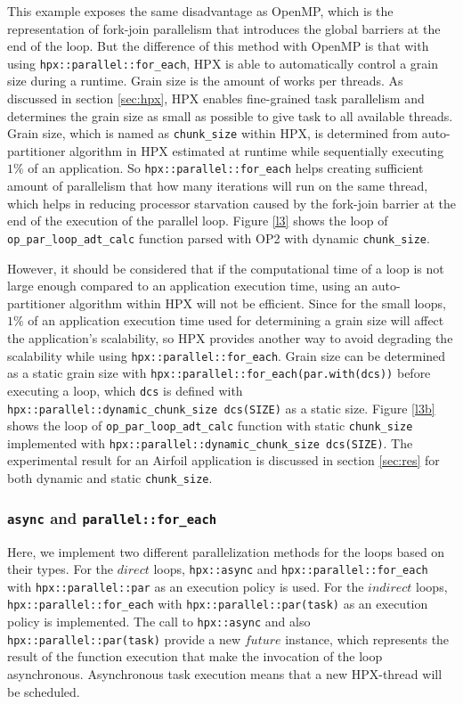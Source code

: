 \documentclass[conference]{IEEEtran}
\begin{document}
This example exposes the same disadvantage as OpenMP, which is the representation of fork-join parallelism that introduces the global barriers at the end of the loop. But the difference of this method with OpenMP is that with using \texttt{hpx::parallel::for\_each}, HPX is able to automatically control a grain size during a runtime. Grain size is the amount of works per threads. As discussed in section \ref{sec:hpx}, HPX enables fine-grained task parallelism and determines the grain size as small as possible to give task to all available threads. Grain size, which is named as \texttt{chunk\_size} within HPX, is determined from auto-partitioner algorithm in HPX estimated at runtime while sequentially executing $1\%$ of an application. So \texttt{hpx::parallel::for\_each} helps creating sufficient amount of parallelism that how many iterations will run on the same thread, which helps in reducing processor starvation caused by the fork-join barrier at the end of the execution of the parallel loop.  Figure \ref{l3} shows the loop of \texttt{op\_par\_loop\_adt\_calc} function parsed with OP2 with dynamic \texttt{chunk\_size}. 

However, it should be considered that if the computational time of a loop is not large enough compared to an application execution time, using an auto-partitioner algorithm within HPX will not be efficient. Since for the small loops, $1\%$ of an application execution time used for determining a grain size will affect the application's scalability, so HPX provides another way to avoid degrading the scalability while using \texttt{hpx::parallel::for\_each}. Grain size can be determined as a static grain size with \texttt{hpx::parallel::for\_each(par.with(dcs))} before executing a loop, which \texttt{dcs} is defined with \texttt{hpx::parallel::dynamic\_chunk\_size dcs(SIZE)} as a static size.  Figure \ref{l3b} shows the loop of \texttt{op\_par\_loop\_adt\_calc} function with static \texttt{chunk\_size} implemented with \texttt{hpx::parallel::dynamic\_chunk\_size dcs(SIZE)}. The experimental result for an Airfoil application is discussed in section \ref{sec:res} for both dynamic and static \texttt{chunk\_size}.

\subsubsection{\textbf{\texttt{async} and \texttt{parallel::for\_each}}}
\label{sec:async}

Here, we implement two different parallelization methods for the loops based on their types. For the $direct$ loops, \texttt{hpx::async} and \texttt{hpx::parallel::for\_each} with \texttt{hpx::parallel::par} as an execution policy is used. For  the $indirect$ loops,  \texttt{hpx::parallel::for\_each} with \texttt{hpx::parallel::par(task)} as an execution policy is implemented. The call to \texttt{hpx::async} and also \texttt{hpx::parallel::par(task)} provide a new $future$ instance, which represents the result of the function execution that make the invocation of the loop asynchronous. Asynchronous task execution means that a new HPX-thread will be scheduled. 
\end{document}

